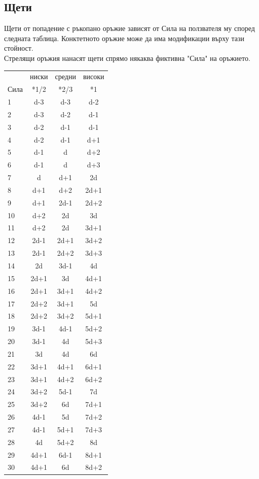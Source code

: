\subsection{Щети}
Щети от попадение с ръкопано оръжие зависят от Сила на ползвателя му според следната таблица.
Конктетното оръжие може да има модификации върху тази стойност.
\\
Стрелящи оръжия нанасят щети спрямо някаква фиктивна "Сила" на оръжието.
\\
\begin{tabular}{l | c | c | c}
     & ниски & средни & високи  \\
Сила & *1/2  & *2/3   & *1      \\
1  & d-3  & d-3  & d-2   \\
2  & d-3  & d-2  & d-1   \\
3  & d-2  & d-1  & d-1   \\
4  & d-2  & d-1  & d+1   \\
5  & d-1  & d    & d+2   \\
6  & d-1  & d    & d+3   \\
7  & d    & d+1  & 2d    \\
8  & d+1  & d+2  & 2d+1  \\
9  & d+1  & 2d-1 & 2d+2  \\
10 & d+2  & 2d   & 3d    \\
11 & d+2  & 2d   & 3d+1  \\
12 & 2d-1 & 2d+1 & 3d+2  \\
13 & 2d-1 & 2d+2 & 3d+3  \\
14 & 2d   & 3d-1 & 4d    \\
15 & 2d+1 & 3d   & 4d+1  \\
16 & 2d+1 & 3d+1 & 4d+2  \\
17 & 2d+2 & 3d+1 & 5d    \\
18 & 2d+2 & 3d+2 & 5d+1  \\
19 & 3d-1 & 4d-1 & 5d+2  \\
20 & 3d-1 & 4d   & 5d+3  \\
21 & 3d   & 4d   & 6d    \\
22 & 3d+1 & 4d+1 & 6d+1  \\
23 & 3d+1 & 4d+2 & 6d+2  \\
24 & 3d+2 & 5d-1 & 7d    \\
25 & 3d+2 & 6d   & 7d+1  \\
26 & 4d-1 & 5d   & 7d+2  \\
27 & 4d-1 & 5d+1 & 7d+3  \\
28 & 4d   & 5d+2 & 8d    \\
29 & 4d+1 & 6d-1 & 8d+1  \\
30 & 4d+1 & 6d   & 8d+2
\end{tabular}


